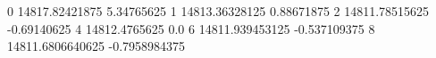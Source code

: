 0 14817.82421875 5.34765625
1 14813.36328125 0.88671875
2 14811.78515625 -0.69140625
4 14812.4765625 0.0
6 14811.939453125 -0.537109375
8 14811.6806640625 -0.7958984375

